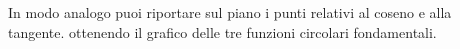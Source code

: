  \vspace{-6pt}
  \begin{center}
\begin{inaccessibleblock}
    
\end{inaccessibleblock}
  \end{center}

In modo analogo puoi riportare sul piano i punti relativi al coseno e alla 
tangente. ottenendo il grafico delle tre funzioni circolari fondamentali.

